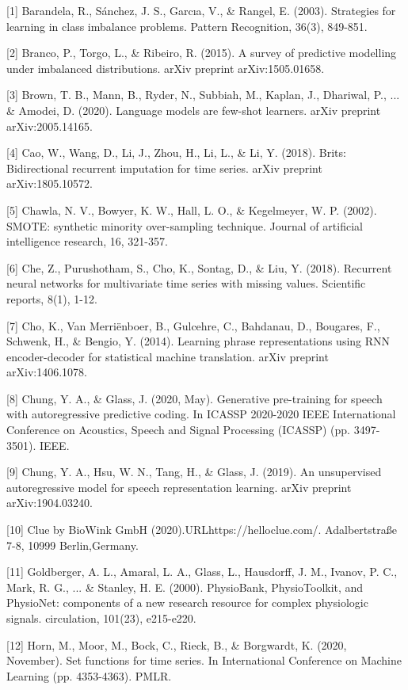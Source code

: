 \documentclass{article}
\begin{document}
{
\small

[1] Barandela, R., Sánchez, J. S., Garcıa, V., \& Rangel, E. (2003). Strategies for learning in class imbalance problems. Pattern Recognition, 36(3), 849-851.

[2] Branco, P., Torgo, L., \& Ribeiro, R. (2015). A survey of predictive modelling under imbalanced distributions. arXiv preprint arXiv:1505.01658.

[3] Brown, T. B., Mann, B., Ryder, N., Subbiah, M., Kaplan, J., Dhariwal, P., ... \& Amodei, D. (2020). Language models are few-shot learners. arXiv preprint arXiv:2005.14165.

[4] Cao, W., Wang, D., Li, J., Zhou, H., Li, L., \& Li, Y. (2018). Brits: Bidirectional recurrent imputation for time series. arXiv preprint arXiv:1805.10572.

[5] Chawla, N. V., Bowyer, K. W., Hall, L. O., \& Kegelmeyer, W. P. (2002). SMOTE: synthetic minority over-sampling technique. Journal of artificial intelligence research, 16, 321-357.

[6] Che, Z., Purushotham, S., Cho, K., Sontag, D., \& Liu, Y. (2018). Recurrent neural networks for multivariate time series with missing values. Scientific reports, 8(1), 1-12.

[7] Cho, K., Van Merriënboer, B., Gulcehre, C., Bahdanau, D., Bougares, F., Schwenk, H., \& Bengio, Y. (2014). Learning phrase representations using RNN encoder-decoder for statistical machine translation. arXiv preprint arXiv:1406.1078.

[8] Chung, Y. A., \& Glass, J. (2020, May). Generative pre-training for speech with autoregressive predictive coding. In ICASSP 2020-2020 IEEE International Conference on Acoustics, Speech and Signal Processing (ICASSP) (pp. 3497-3501). IEEE.

[9] Chung, Y. A., Hsu, W. N., Tang, H., \& Glass, J. (2019). An unsupervised autoregressive model for speech representation learning. arXiv preprint arXiv:1904.03240.

[10] Clue   by   BioWink   GmbH   (2020).URLhttps://helloclue.com/. Adalbertstraße 7-8, 10999 Berlin,Germany. 

[11] Goldberger, A. L., Amaral, L. A., Glass, L., Hausdorff, J. M., Ivanov, P. C., Mark, R. G., ... \& Stanley, H. E. (2000). PhysioBank, PhysioToolkit, and PhysioNet: components of a new research resource for complex physiologic signals. circulation, 101(23), e215-e220.

[12] Horn, M., Moor, M., Bock, C., Rieck, B., \& Borgwardt, K. (2020, November). Set functions for time series. In International Conference on Machine Learning (pp. 4353-4363). PMLR.

}
\end{document}
